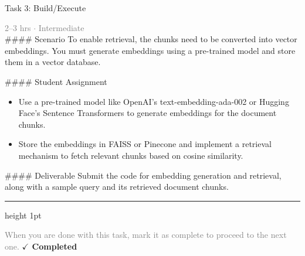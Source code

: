 \documentclass[10pt,a4paper]{article}
\begin{document}
\begin{taskbox}{Task 3: Build/Execute}

    {\small \textcolor{gray}{2--3 hrs $\cdot$ Intermediate}}\\[12pt]

    \#\#\#\# Scenario  
To enable retrieval, the chunks need to be converted into vector embeddings. You must generate embeddings using a pre-trained model and store them in a vector database.  

\#\#\#\# Student Assignment  
\begin{itemize}
    \item Use a pre-trained model like OpenAI's text-embedding-ada-002 or Hugging Face's Sentence Transformers to generate embeddings for the document chunks.  
    \item Store the embeddings in FAISS or Pinecone and implement a retrieval mechanism to fetch relevant chunks based on cosine similarity.  
\end{itemize}

\#\#\#\# Deliverable  
Submit the code for embedding generation and retrieval, along with a sample query and its retrieved document chunks.\par

    \vspace{16pt}

    \textcolor{cardBorder}{\hrule height 1pt}\vspace{8pt}

    \small \textcolor{gray}{When you are done with this task, mark it as complete to proceed to the next one.} \hfill \textbf{\textcolor{brandDark}{$\checkmark$ Completed}}

\end{taskbox}
\end{document}
